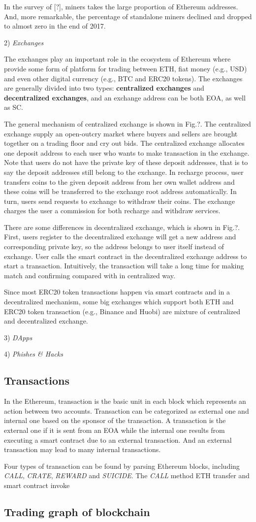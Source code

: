 In the survey of [?], miners takes the large proportion of Ethereum addresses. And, more remarkable, the percentage of standalone miners declined and dropped to almost zero in the end of 2017. 

2) \emph{Exchanges}

The exchanges play an important role in the ecosystem of Ethereum where provide some form of platform for trading between ETH, fiat money (e.g., USD) and even other digital currency (e.g., BTC and ERC20 tokens). The exchanges are generally divided into two types: \textbf{centralized exchanges} and \textbf{decentralized exchanges}, and an exchange address can be both EOA, as well as SC. 

The general mechanism of centralized exchange is shown in Fig.?. The centralized exchange supply an open-outcry market where buyers and sellers are brought together on a trading floor and cry out bids. The centralized exchange allocates one deposit address to each user who wants to make transaction in the exchange. Note that users do not have the private key of these deposit addresses, that is to say the deposit addresses still belong to the exchange. In recharge process, user transfers coins to the given deposit address from her own wallet address and these coins will be transferred to the exchange root address automatically. In turn, users send requests to exchange to withdraw their coins. The exchange charges the user a commission for both recharge and withdraw services.

There are some differences in decentralized exchange, which is shown in Fig.?. First, users register to the decentralized exchange will get a new address and corresponding private key, so the address belongs to user itself instead of exchange. User calls the smart contract in the decentralized exchange address to start a transaction. Intuitively, the transaction will take a long time for making match and confirming compared with in centralized way.

Since most ERC20 token transactions happen via smart contracts and in a decentralized mechanism, some big exchanges which support both ETH and ERC20 token transaction (e.g., Binance and Huobi) are mixture of centralized and decentralized exchange.

3) \emph{DApps}

4) \emph{Phishes \& Hacks}

\subsection{Transactions}
In the Ethereum, transaction is the basic unit in each block which represents an action between two accounts. Transaction can be categorized as external one and internal one based on the sponsor of the transaction. A transaction is the external one if it is sent from an EOA while the internal one results from executing a smart contract due to an external transaction. And an external transaction may lead to many internal transactions\cite{chen2018infocom}.

Four types of transaction can be found by parsing Ethereum blocks, including \emph{CALL}, \emph{CRATE}, \emph{REWARD} and \emph{SUICIDE}. The \emph{CALL} method  ETH transfer and smart contract invoke 


\subsection{Trading graph of blockchain}
